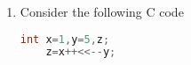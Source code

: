 \documentclass[journal]{IEEEtran}
\begin{document}
\begin{enumerate}
	\begin{enumerate}
\end{enumerate}
\item Consider the following C code
\begin{lstlisting}[language=C]
    int x=1,y=5,z;
    z=x++<<--y;
\end{lstlisting}


\end{enumerate}
\end{document}
